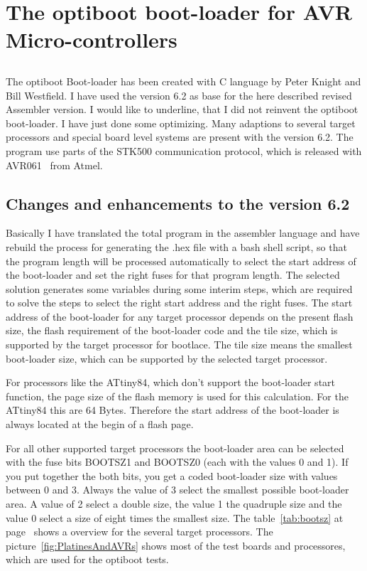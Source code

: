 \chapter{The optiboot boot-loader for AVR Micro-controllers}

\section*{}
The optiboot Boot-loader has been created with C language by Peter Knight and
Bill Westfield. I have used the version 6.2 as base
for the here described revised Assembler version.
I would like to underline, that I did not reinvent the
optiboot boot-loader. I have just done some optimizing.
Many adaptions to several target processors and special
board level systems are present with the version 6.2.
The program use parts of the STK500 communication protocol,
which is released with AVR061~\cite{stk500} from Atmel.


\section{Changes and enhancements to the version 6.2}
Basically I have translated the total program in the assembler language
and have rebuild the process for generating the .hex file
with a bash shell script, so that the program length will
be processed automatically to select the start address of the boot-loader
and set the right fuses for that program length.
The selected solution generates some variables during some
interim steps, which are required to solve the steps
to select the right start address and the right fuses.
The start address of the boot-loader for any target processor
depends on the present flash size, the flash requirement
of the boot-loader code and the tile size, which is supported
by the target processor for bootlace.
The tile size means the smallest boot-loader size, which can be supported
by the selected target processor.


For processors like the ATtiny84, which don't support the boot-loader start function,
the page size of the flash memory is used for this calculation.
For the ATtiny84 this are 64 Bytes. Therefore the start address of
the boot-loader is always located at the begin of a flash page.

For all other supported target processors the boot-loader area can be
selected with the fuse bits BOOTSZ1 and BOOTSZ0 (each with the values 0 and 1).
If you put together the both bits, you get a coded boot-loader size
with values between 0 and 3.
Always the value of 3 select the smallest possible boot-loader area.
A value of 2 select a double size, the value 1 the quadruple size
and the value 0 select a size of eight times the smallest size.
The table~\ref{tab:bootsz} at page~\pageref{tab:bootsz} shows a 
overview for the several target processors.
The picture~\ref{fig:PlatinesAndAVRs} shows most of the test boards and processores,
which are used for the optiboot tests.

